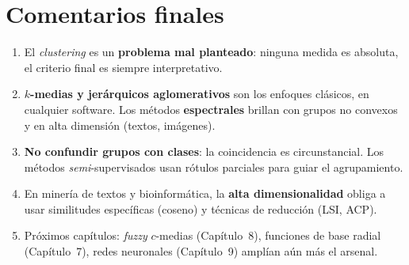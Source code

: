 \section{Comentarios finales}

\begin{enumerate}[leftmargin=1.2cm]
  \item El \emph{clustering} es un \textbf{problema mal planteado}:
        ninguna medida es absoluta, el criterio final es siempre
        interpretativo.
  \item \textbf{$k$-medias y jerárquicos aglomerativos} son los
        enfoques clásicos, en cualquier software. Los métodos
        \textbf{espectrales} brillan con grupos no convexos y en alta
        dimensión (textos, imágenes).
  \item \textbf{No confundir grupos con clases}: la coincidencia es
        circunstancial. Los métodos \emph{semi}-supervisados usan
        rótulos parciales para guiar el agrupamiento.
  \item En minería de textos y bioinformática, la \textbf{alta
        dimensionalidad} obliga a usar similitudes específicas
        (coseno) y técnicas de reducción (LSI, ACP).
  \item Próximos capítulos: \emph{fuzzy} $c$-medias (Capítulo~8),
        funciones de base radial (Capítulo~7), redes neuronales
        (Capítulo~9) amplían aún más el arsenal.
\end{enumerate}


